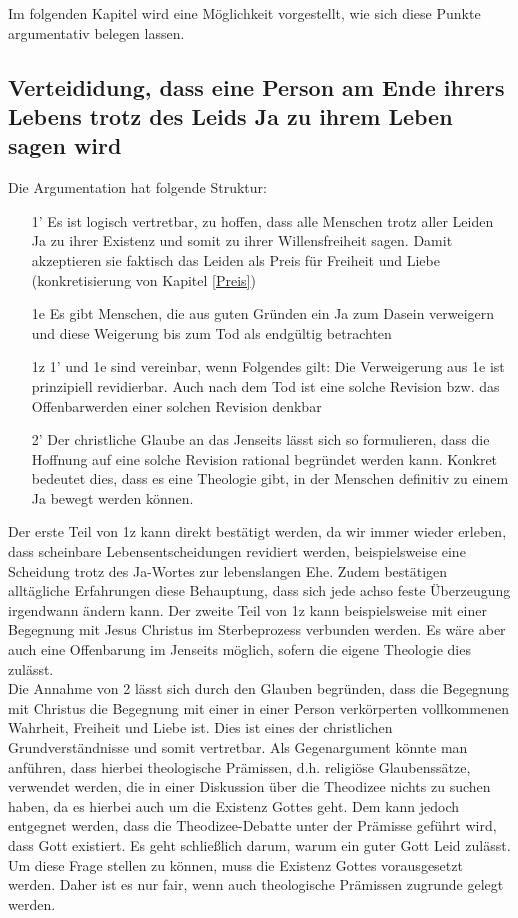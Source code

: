 Im folgenden Kapitel wird eine Möglichkeit vorgestellt, wie sich diese Punkte argumentativ belegen lassen.

\subsection{Verteididung, dass eine Person am Ende ihrers Lebens trotz des Leids Ja zu ihrem Leben sagen wird} \label{ende_leben}
Die Argumentation hat folgende Struktur:
\begin{itemize}
	\item[1'] Es ist logisch vertretbar, zu hoffen, dass alle Menschen trotz aller Leiden Ja zu ihrer Existenz und somit zu ihrer Willensfreiheit sagen. Damit akzeptieren sie faktisch das Leiden als Preis für Freiheit und Liebe (konkretisierung von Kapitel \ref{Preis})
	\item[1e] Es gibt Menschen, die aus guten Gründen ein Ja zum Dasein verweigern und diese Weigerung bis zum Tod als endgültig betrachten
	\item[1z] 1' und 1e sind vereinbar, wenn Folgendes gilt: Die Verweigerung aus 1e ist prinzipiell revidierbar. Auch nach dem Tod ist eine solche Revision bzw. das Offenbarwerden einer solchen Revision denkbar
	\item[2'] Der christliche Glaube an das Jenseits lässt sich so formulieren, dass die Hoffnung auf eine solche Revision rational begründet werden kann. Konkret bedeutet dies, dass es eine Theologie gibt, in der Menschen definitiv zu einem Ja bewegt werden können.
\end{itemize}

Der erste Teil von 1z kann direkt bestätigt werden, da wir immer wieder erleben, dass scheinbare Lebensentscheidungen revidiert werden, beispielsweise eine Scheidung trotz des Ja-Wortes zur lebenslangen Ehe. Zudem bestätigen alltägliche Erfahrungen diese Behauptung, dass sich jede achso feste Überzeugung irgendwann ändern kann. Der zweite Teil von 1z kann beispielsweise mit einer Begegnung mit Jesus Christus im Sterbeprozess verbunden werden. Es wäre aber auch eine Offenbarung im Jenseits möglich, sofern die eigene Theologie dies zulässt.\\

Die Annahme von 2 lässt sich durch den Glauben begründen, dass die Begegnung mit Christus die Begegnung mit einer in einer Person verkörperten vollkommenen Wahrheit, Freiheit und Liebe ist. Dies ist eines der christlichen Grundverständnisse und somit vertretbar. Als Gegenargument könnte man anführen, dass hierbei theologische Prämissen, d.h. religiöse Glaubenssätze, verwendet werden, die in einer Diskussion über die Theodizee nichts zu suchen haben, da es hierbei auch um die Existenz Gottes geht. Dem kann jedoch entgegnet werden, dass die Theodizee-Debatte unter der Prämisse geführt wird, dass Gott existiert. Es geht schließlich darum, warum ein guter Gott Leid zulässt. Um diese Frage stellen zu können, muss die Existenz Gottes vorausgesetzt werden. Daher ist es nur fair, wenn auch theologische Prämissen zugrunde gelegt werden.

